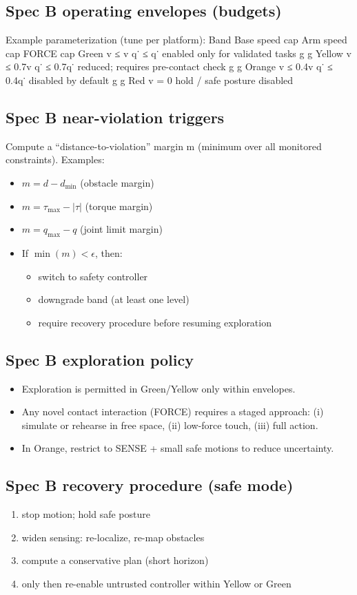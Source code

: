 \documentclass[11pt]{article}
\begin{document}
\subsection{Spec B operating envelopes (budgets)}
Example parameterization (tune per platform):
Band Base speed cap Arm speed cap FORCE cap
Green v ≤ v q˙ ≤ q˙ enabled only for validated tasks
g g
Yellow v ≤ 0.7v q˙ ≤ 0.7q˙ reduced; requires pre-contact check
g g
Orange v ≤ 0.4v q˙ ≤ 0.4q˙ disabled by default
g g
Red v = 0 hold / safe posture disabled
\subsection{Spec B near-violation triggers}
Compute a “distance-to-violation” margin m (minimum over all monitored constraints). Examples:
\begin{itemize}
\item $m = d - d_{\min}$ (obstacle margin)
\item $m = \tau_{\max} - \lvert\tau\rvert$ (torque margin)
\item $m = q_{\max} - q$ (joint limit margin)
\item If $\min(m) < \epsilon$, then:
  \begin{itemize}
  \item switch to safety controller
  \item downgrade band (at least one level)
  \item require recovery procedure before resuming exploration
  \end{itemize}
\end{itemize}
\subsection{Spec B exploration policy}
\begin{itemize}
\item 
Exploration is permitted in Green/Yellow only within envelopes.
\item 
Any novel contact interaction (FORCE) requires a staged approach: (i) simulate or rehearse in
free space, (ii) low-force touch, (iii) full action.
\item 
In Orange, restrict to SENSE + small safe motions to reduce uncertainty.
\end{itemize}
\subsection{Spec B recovery procedure (safe mode)}
\begin{enumerate}
\item stop motion; hold safe posture
\item widen sensing: re-localize, re-map obstacles
\item compute a conservative plan (short horizon)
\item only then re-enable untrusted controller within Yellow or Green
\end{enumerate}
\end{document}
